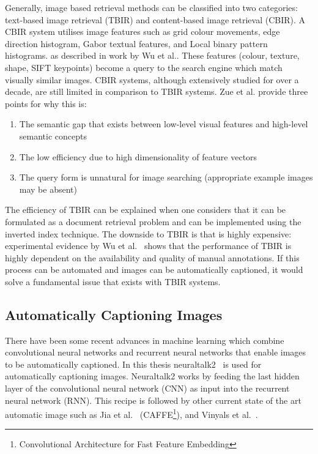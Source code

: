 Generally, image based retrieval methods can be classified into two categories: text-based image retrieval (TBIR) and content-based image retrieval (CBIR). A CBIR system utilises image features such as grid colour movements, edge direction histogram, Gabor textual features, and Local binary pattern histograms. as described in work by Wu et al.\cite{wu2009distance}. These features (colour, texture, shape, SIFT keypoints) become a query to the search engine which match visually similar images. CBIR systems, although extensively studied for over a decade, are still limited in comparison to TBIR systems. Zue et al.\cite{zhu2010image} provide three points for why this is:
\begin{enumerate}
    \item The semantic gap that exists between low-level visual features and high-level semantic concepts
    \item The low efficiency due to high dimensionality of feature vectors
    \item The query form is unnatural for image searching (appropriate example images may be absent)
\end{enumerate}
The efficiency of TBIR can be explained when one considers that it can be formulated as a document retrieval problem and can be implemented using the inverted index technique. The downside to TBIR is that is highly expensive: experimental evidence by Wu et al.~\cite{wu2013tag} shows that the performance of TBIR is highly dependent on the availability and quality of manual annotations. If this process can be automated and images can be automatically captioned, it would solve a fundamental issue that exists with TBIR systems.

\subsection{Automatically Captioning Images}

There have been some recent advances in machine learning which combine convolutional neural networks and recurrent neural networks that enable images to be automatically captioned. In this thesis neuraltalk2~\cite{karpathy2015deep} is used for automatically captioning images. Neuraltalk2 works by  feeding the last hidden layer of the convolutional neural network (CNN) as input into the recurrent neural network (RNN). This recipe is followed by other current state of the art automatic image such as Jia et al.~\cite{jia2014caffe} (CAFFE\footnote{Convolutional Architecture for Fast Feature Embedding}), and Vinyals et al.~\cite{arXiv2016160906647V}.

